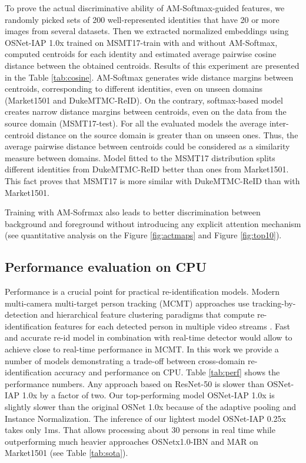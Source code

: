 \documentclass[a4paper,conference]{IEEEtran}
\begin{document}
To prove the actual discriminative ability of AM-Softmax-guided features, we
randomly picked sets of 200 well-represented identities that have 20 or more
images from several datasets.  Then we extracted normalized embeddings using
OSNet-IAP 1.0x trained on MSMT17-train with and without AM-Softmax, computed
centroids for each identity and estimated average pairwise cosine distance
between the obtained centroids. Results of this experiment are presented in the
Table \ref{tab:cosine}. AM-Softmax generates wide distance margins between
centroids, corresponding to different identities, even on
unseen domains (Market1501 and DukeMTMC-ReID). On the contrary, softmax-based model creates
narrow distance margins between centroids, even on the data from the source domain (MSMT17-test).
For all the evaluated models the average inter-centroid distance on the source domain is greater than on
unseen ones. Thus, the average pairwise distance between centroids could be considered
as a similarity measure between domains. Model fitted to the MSMT17 distribution splits different identities
from DukeMTMC-ReID better than ones from Market1501. This fact proves that
MSMT17 is more similar with DukeMTMC-ReID than with Market1501.

Training with AM-Sofrmax also leads to better discrimination between background
and foreground without introducing any explicit attention mechanism (see
quantitative analysis on the Figure \ref{fig:actmaps} and Figure
\ref{fig:top10}).

\subsection{Performance evaluation on CPU}

Performance is a crucial point for practical re-identification models.  Modern
multi-camera multi-target person tracking (MCMT) approaches use
tracking-by-detection and hierarchical feature clustering paradigms that compute
re-identification features for each detected person in multiple video streams
\cite{zhang2017multitarget, Li2019StateawareRF}. Fast and accurate re-id model
in combination with real-time detector would allow to achieve close to real-time
performance in MCMT. In this work we provide a number of models demonstrating a
trade-off between cross-domain re-identification accuracy and performance on
CPU.  Table \ref{tab:perf} shows the performance numbers.  Any approach based on
ResNet-50 is slower than OSNet-IAP 1.0x by a factor of two. Our top-performing
model OSNet-IAP 1.0x is slightly slower than the original OSNet 1.0x because of
the adaptive pooling and Instance Normalization.  The inference of our lightest
model OSNet-IAP 0.25x takes only 1ms. That allows processing about 30 persons in
real time while outperforming much heavier approaches OSNetx1.0-IBN
\cite{zhou2019osnet} and MAR \cite{Yu2019UnsupervisedPR} on Market1501 (see
Table \ref{tab:sota}).
\end{document}

